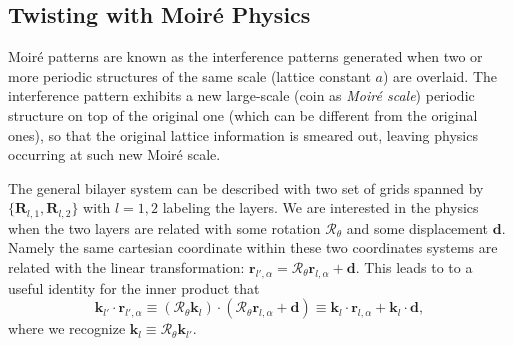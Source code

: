 \subsection{Twisting with Moir\'{e} Physics}
Moir\'e patterns are known as the interference patterns generated when two or more periodic structures of the same scale (lattice constant $a$) are overlaid. The interference pattern exhibits a new large-scale (coin as \emph{Moir\'{e} scale}) periodic structure on top of the original one (which can be different from the original ones), so that the original lattice information is smeared out, leaving physics occurring at such new Moir\'{e} scale.

The general bilayer system can be described with two set of grids spanned by $\{\bm R_{l,1},\bm R_{l,2}\}$ with $l=1,2$ labeling the layers. We are interested in the physics when the two layers are related with some rotation $\mathcal R_\theta$  and some displacement $\bm d$. Namely the same cartesian coordinate within these two coordinates systems are related with the linear transformation: $\bm{r}_{l',\alpha}=\mathcal R_\theta\bm{r}_{l,\alpha}+\bm d$. This leads to to a useful identity for the inner product that
\begin{equation}\label{eq:twisted dot product}
    \bm k_{l'}\cdot\bm r_{l',\alpha}\equiv(\mathcal R_\theta\bm k_l)\cdot(\mathcal R_\theta\bm r_{l,\alpha}+\bm d)\equiv\bm k_l\cdot\bm r_{l,\alpha}+\bm k_l\cdot\bm d,
\end{equation}
where we recognize $\bm k_l\equiv\mathcal R_\theta\bm k_{l'}$.

